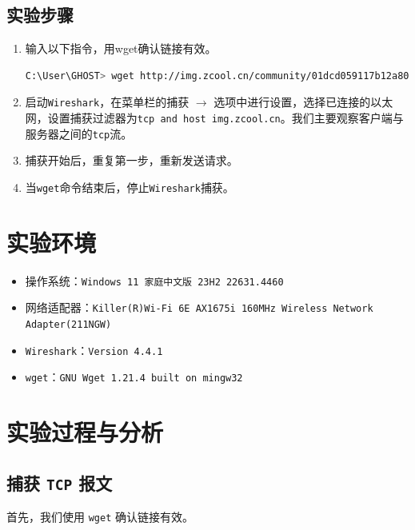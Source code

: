 \documentclass{article}
\begin{document}
	\subsection{实验步骤}
	
	\begin{enumerate}[noitemsep, label={{\arabic*})}]
		\item 输入以下指令，用wget确认链接有效。
		
		\begin{lstlisting}[language=bash]
        C:\User\GHOST> wget http://img.zcool.cn/community/01dcd059117b12a801216a3e9c4fd5.jpg
		\end{lstlisting}
		
		\item 启动\texttt{Wireshark}，在菜单栏的捕获 \( \to \) 选项中进行设置，选择已连接的以太网，设置捕获过滤器为\texttt{tcp and host img.zcool.cn}。我们主要观察客户端与服务器之间的\texttt{tcp}流。
		\item 捕获开始后，重复第一步，重新发送请求。
		\item 当\texttt{wget}命令结束后，停止\texttt{Wireshark}捕获。
	\end{enumerate}\textbf{}
	
	\section{实验环境}
	
	\begin{itemize}[noitemsep]
		\item 操作系统：\texttt{Windows 11 家庭中文版 23H2 22631.4460}
		\item 网络适配器：\texttt{Killer(R)Wi-Fi 6E AX1675i 160MHz Wireless Network Adapter(211NGW)}
		\item \texttt{Wireshark}：\texttt{Version 4.4.1}
		\item \texttt{wget}：\texttt{GNU Wget 1.21.4 built on mingw32}
	\end{itemize}
	
	\section{实验过程与分析}
	
	\subsection{捕获 \texttt{TCP} 报文}
	
	首先，我们使用 \texttt{wget} 确认链接有效。
	
\end{document}
